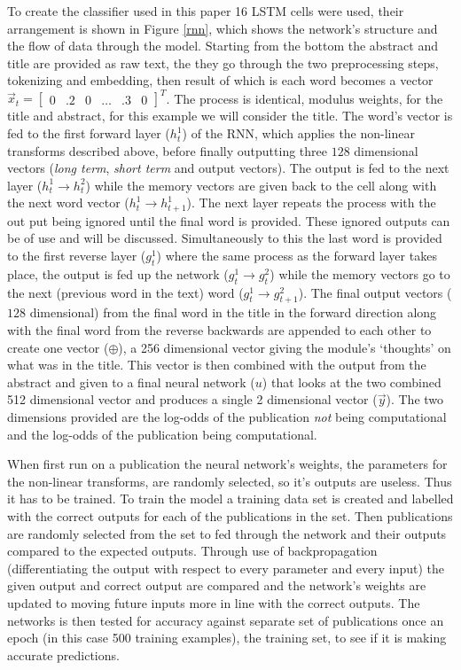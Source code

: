\documentclass[12pt, a4paper]{article}
\begin{document}
To create the classifier used in this paper 16 LSTM cells were used, their arrangement is shown in Figure \ref{rnn}, which shows the network's structure and the flow of data through the model. Starting from the bottom the abstract and title are provided as raw text, the they go through the two preprocessing steps, tokenizing and embedding, then result of which is each word becomes a vector $\vec{x}_t = \begin{bmatrix}0&.2&0&\dots&.3&0\end{bmatrix}^T$. The process is identical, modulus weights, for the title and abstract, for this example we will consider the title. The word's vector is fed to the first forward layer ($h_t^1$) of the RNN, which applies the non-linear transforms described above, before finally outputting three $128$ dimensional vectors (\textit{long term}, \textit{short term} and output vectors). The output is fed to the next layer ($h_t^1 \rightarrow h^2_t$) while the memory vectors are given back to the cell along with the next word vector ($h_t^1 \rightarrow h^1_{t+1}$). The next layer repeats the process with the out put being ignored until the final word is provided. These ignored outputs can be of use and will be discussed. Simultaneously to this the last word is provided to the first reverse layer  ($g^1_t$) where the same process as the forward layer takes place, the output is fed up the network ($g_t^1 \rightarrow g^2_t$) while the memory vectors go to the next (previous word in the text) word  ($g_t^1 \rightarrow g^2_{t+1}$). The final output vectors ($128$ dimensional) from the final word in the title in the forward direction along with the final word from the reverse backwards are appended to each other to create one vector ($\oplus$), a 256 dimensional vector giving the module's `thoughts' on what was in the title. This vector is then combined with the output from the abstract and given to a final neural network ($u$) that looks at the two combined 512 dimensional vector and produces a single 2 dimensional vector ($\vec{y}$). The two dimensions provided are the log-odds of the publication \textit{not} being computational and the log-odds of the publication being computational.

When first run on a publication the neural network's weights, the parameters for the non-linear transforms, are randomly selected, so it's outputs are useless. Thus it has to be trained. To train the model a training data set is created and labelled with the correct outputs for each of the publications in the set. Then publications are randomly selected from the set to fed through the network and their outputs compared to the expected outputs. Through use of backpropagation \citep{werbos1982applications} (differentiating the output with respect to every parameter and every input) the given output and correct output are compared and the network's weights are updated to moving future inputs more in line with the correct outputs. The networks is then tested for accuracy against separate set of publications once an epoch (in this case 500 training examples), the training set, to see if it is making accurate predictions.
\end{document}
